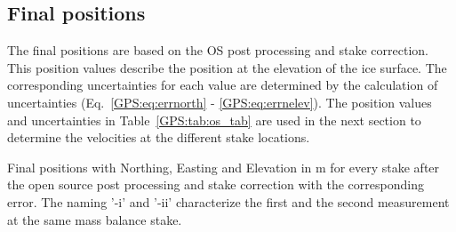 \subsection{Final positions}

The final positions are based on the OS post processing and stake correction.
This position values describe the position at the elevation of the ice surface. 
The corresponding uncertainties for each value are determined by the calculation of uncertainties (Eq.~\ref{GPS:eq:errnorth} - \ref{GPS:eq:errnelev}). 
The position values and uncertainties in Table~\ref{GPS:tab:os_tab} are used in the next section to determine the velocities at the different stake locations. 

\begin{table}[H]
	\caption{Final positions with Northing, Easting and Elevation in m for every stake after the open source post processing and stake correction with the corresponding error. The naming '-i' and '-ii' characterize the first and the second measurement at the same mass balance stake.}
	\centering
	
	\label{GPS:tab:os_tab}
\end{table}
